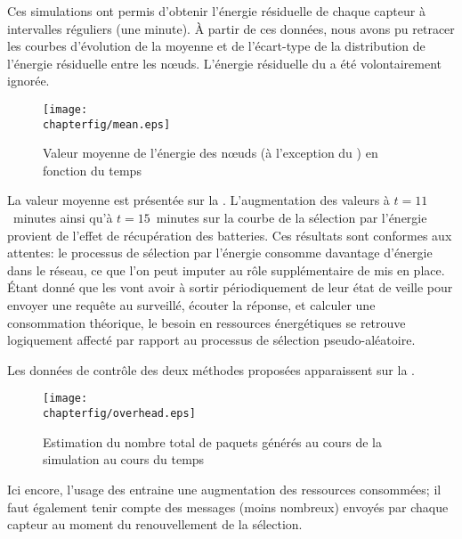 Ces simulations ont permis d'obtenir l'énergie résiduelle de chaque capteur à intervalles réguliers (une minute).
À partir de ces données, nous avons pu retracer les courbes d'évolution de la moyenne et de l'écart-type de la distribution de l'énergie résiduelle entre les nœuds.
L'énergie résiduelle du \ch a été volontairement ignorée.
\begin{figure}[!ht]
    \centering
    \texttt{[image: \\chapterfig/mean.eps]}
    \caption{Valeur moyenne de l'énergie des nœuds (à l'exception du \ch) en fonction du temps}\label{se:fig:mean}
\end{figure}
La valeur moyenne est présentée sur la .
L'augmentation des valeurs à $t=11$~minutes ainsi qu'à $t=15$~minutes sur la courbe de la sélection par l'énergie provient de l'effet de récupération des batteries.
Ces résultats sont conformes aux attentes: le processus de sélection par l'énergie consomme davantage d'énergie dans le réseau, ce que l'on peut imputer au rôle supplémentaire de \vn mis en place.
Étant donné que les \vns vont avoir à sortir périodiquement de leur état de veille pour envoyer une requête au \cn surveillé, écouter la réponse, et calculer une consommation théorique, le besoin en ressources énergétiques se retrouve logiquement affecté par rapport au processus de sélection pseudo-aléatoire.

Les données de contrôle des deux méthodes proposées apparaissent sur la .
\begin{figure}[!ht]
    \centering
    \texttt{[image: \\chapterfig/overhead.eps]}
    \caption{Estimation du nombre total de paquets générés au cours de la simulation au cours du temps}\label{se:fig:overhead}
\end{figure}
Ici encore, l'usage des \vns entraine une augmentation des ressources consommées; il faut également tenir compte des messages (moins nombreux) envoyés par chaque capteur au moment du renouvellement de la sélection.

